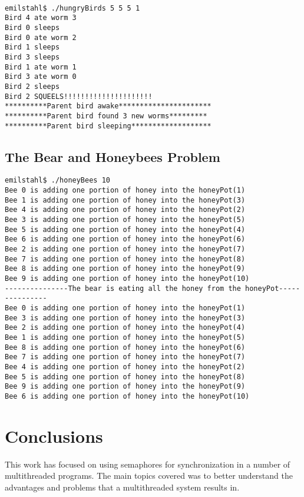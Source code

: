 \documentclass{article}
\begin{document}
\begin{verbatim}

emilstahl$ ./hungryBirds 5 5 5 1
Bird 4 ate worm 3
Bird 0 sleeps
Bird 0 ate worm 2
Bird 1 sleeps
Bird 3 sleeps
Bird 1 ate worm 1
Bird 3 ate worm 0
Bird 2 sleeps
Bird 2 SQUEELS!!!!!!!!!!!!!!!!!!!!!
**********Parent bird awake**********************
**********Parent bird found 3 new worms*********
**********Parent bird sleeping*******************

\end{verbatim}

\subsection{The Bear and Honeybees Problem}

\begin{verbatim}
emilstahl$ ./honeyBees 10
Bee 0 is adding one portion of honey into the honeyPot(1)
Bee 1 is adding one portion of honey into the honeyPot(3)
Bee 4 is adding one portion of honey into the honeyPot(2)
Bee 3 is adding one portion of honey into the honeyPot(5)
Bee 5 is adding one portion of honey into the honeyPot(4)
Bee 6 is adding one portion of honey into the honeyPot(6)
Bee 2 is adding one portion of honey into the honeyPot(7)
Bee 7 is adding one portion of honey into the honeyPot(8)
Bee 8 is adding one portion of honey into the honeyPot(9)
Bee 9 is adding one portion of honey into the honeyPot(10)
---------------The bear is eating all the honey from the honeyPot---------------
Bee 0 is adding one portion of honey into the honeyPot(1)
Bee 3 is adding one portion of honey into the honeyPot(3)
Bee 2 is adding one portion of honey into the honeyPot(4)
Bee 1 is adding one portion of honey into the honeyPot(5)
Bee 8 is adding one portion of honey into the honeyPot(6)
Bee 7 is adding one portion of honey into the honeyPot(7)
Bee 4 is adding one portion of honey into the honeyPot(2)
Bee 5 is adding one portion of honey into the honeyPot(8)
Bee 9 is adding one portion of honey into the honeyPot(9)
Bee 6 is adding one portion of honey into the honeyPot(10)
\end{verbatim}



\section{Conclusions}

This work has focused on using semaphores for synchronization in a number of multithreaded programs. The main topics covered was to better understand the advantages and problems that a multithreaded system results in. 












\end{document}
